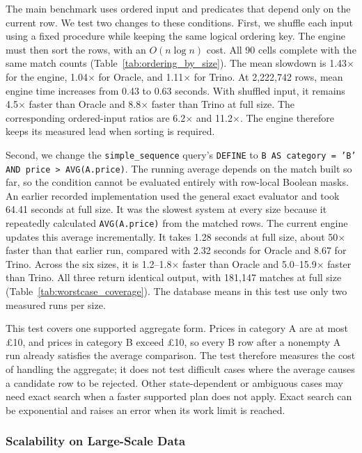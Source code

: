 \documentclass[preprint,12pt,times,a4paper]{elsarticle}
\begin{document}
The main benchmark uses ordered input and predicates that depend only on the
current row. We test two changes to these conditions. First, we shuffle each
input using a fixed procedure while keeping the same logical ordering key.
The engine must then sort the rows, with an $O(n\log n)$ cost. All 90 cells
complete with the same match counts (Table~\ref{tab:ordering_by_size}). The
mean slowdown is 1.43$\times$ for the engine, 1.04$\times$ for Oracle, and
1.11$\times$ for Trino. At 2,222,742 rows, mean engine time increases from
0.43 to 0.63 seconds. With shuffled input, it remains 4.5$\times$ faster
than Oracle and 8.8$\times$ faster than Trino at full size. The corresponding
ordered-input ratios are 6.2$\times$ and 11.2$\times$. The engine therefore
keeps its measured lead when sorting is required.

Second, we change the \texttt{simple\_sequence} query's \texttt{DEFINE} to
\texttt{B AS category = 'B' AND price > AVG(A.price)}. The running average
depends on the match built so far, so the condition cannot be evaluated
entirely with row-local Boolean masks. An earlier recorded implementation
used the general exact evaluator and took 64.41 seconds at full size. It was
the slowest system at every size because it repeatedly calculated
\texttt{AVG(A.price)} from the matched rows. The current engine updates this
average incrementally. It takes 1.28 seconds at full size, about 50$\times$
faster than that earlier run, compared with 2.32 seconds for Oracle and
8.67 for Trino. Across the six sizes, it is 1.2--1.8$\times$ faster than
Oracle and 5.0--15.9$\times$ faster than Trino. All three return identical
output, with 181,147 matches at full size (Table~\ref{tab:worstcase_coverage}).
The database means in this test use only two measured runs per size.

This test covers one supported aggregate form. Prices in category A are at most
\pounds10, and prices in category B exceed \pounds10, so every B row after a nonempty A
run already satisfies the average comparison. The test therefore measures
the cost of handling the aggregate; it does not test difficult cases where
the average causes a candidate row to be rejected. Other state-dependent or
ambiguous cases may need exact search when a faster supported plan does not
apply. Exact search can be exponential and raises an error when its work
limit is reached.

\subsubsection{Scalability on Large-Scale Data}
\label{sec:scalability}
\end{document}
